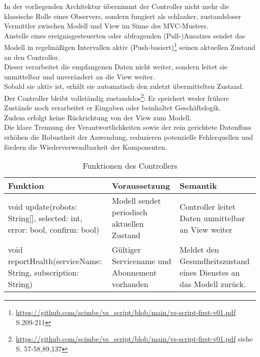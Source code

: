 In der vorliegenden Architektur übernimmt der Controller nicht mehr die klassische Rolle eines Observers, sondern fungiert als schlanker, zustandsloser Vermittler zwischen Modell und View im Sinne des MVC-Musters. \\
Anstelle eines ereignisgesteuerten oder abfragenden (Pull-)Ansatzes sendet das Modell in regelmäßigen Intervallen aktiv (Push-basiert)\footnote{\url{https://github.com/scimbe/vs_script/blob/main/vs-script-first-v01.pdf} S.209-211} seinen aktuellen Zustand an den Controller. \\
Dieser verarbeitet die empfangenen Daten nicht weiter, sondern leitet sie unmittelbar und unverändert an die View weiter.\\
Sobald sie aktiv ist, erhält sie automatisch den zuletzt übermittelten Zustand.\\
Der Controller bleibt vollständig zustandslos\footnote{\url{https://github.com/scimbe/vs_script/blob/main/vs-script-first-v01.pdf} siehe S. 57-58,89,137}: Er speichert weder frühere Zustände noch verarbeitet er Eingaben oder beinhaltet Geschäftslogik. \\
Zudem erfolgt keine Rückrichtung von der View zum Modell. \\
Die klare Trennung der Verantwortlichkeiten sowie der rein gerichtete Datenfluss erhöhen die Robustheit der Anwendung, reduzieren potenzielle Fehlerquellen und fördern die Wiederverwendbarkeit der Komponenten.\\
\begin{table}[h!]
    \centering
    \begin{tabular}{|p{5cm}|p{5cm}|p{5cm}|}
        \hline
        \textbf{Funktion} & \textbf{Voraussetzung} & \textbf{Semantik} \\
        \hline
        void update(robots: String[], selected: int, error: bool, confirm: bool) & Modell sendet periodisch aktuellen Zustand & Controller leitet Daten unmittelbar an View weiter \\
        \hline
        void reportHealth(serviceName: String, subscription: String) & Gültiger Servicename und Abonnement vorhanden & Meldet den Gesundheitszustand eines Dienstes an das Modell zurück. \\
        \hline
    \end{tabular}
    \caption{Funktionen des Controllers}
    \label{tab:Controller}
\end{table}

\clearpage

